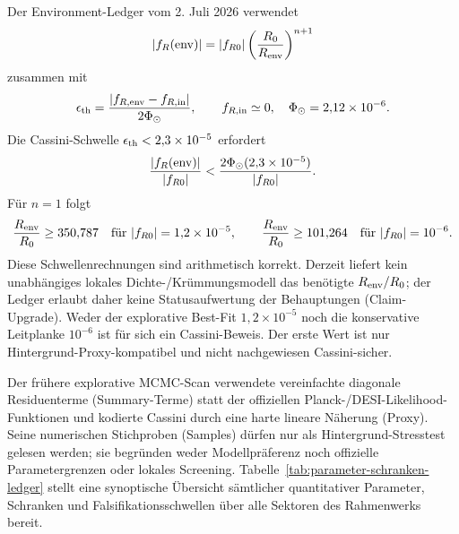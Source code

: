 \documentclass[12pt,a4paper]{article}
\theoremstyle{definition}
\theoremstyle{plain}
\theoremstyle{remark}
\begin{document}
Der Environment-Ledger vom 2. Juli 2026 verwendet
\begin{equation}\label{eq:environment-contract}
 |f_R({\rm env})|
 =|f_{R0}|\left(\frac{R_0}{R_{\rm env}}\right)^{n+1}
\end{equation}
zusammen mit
\[
 \epsilon_{\rm th}
 =\frac{|f_{R,{\rm env}}-f_{R,{\rm in}}|}{2\Phi_\odot},
 \qquad f_{R,{\rm in}}\simeq0,\quad
 \Phi_\odot=2{,}12\times10^{-6}.
\]
Die Cassini-Schwelle \(\epsilon_{\rm th}<2{,}3\times10^{-5}\) erfordert
\begin{equation}
 \frac{|f_R({\rm env})|}{|f_{R0}|}
 <\frac{2\Phi_\odot(2{,}3\times10^{-5})}{|f_{R0}|}.
\end{equation}
Für \(n=1\) folgt
\[
 \frac{R_{\rm env}}{R_0}\ge350{,}787
 \quad\text{für }|f_{R0}|=1{,}2\times10^{-5},
 \qquad
 \frac{R_{\rm env}}{R_0}\ge101{,}264
 \quad\text{für }|f_{R0}|=10^{-6}.
\]
Diese Schwellenrechnungen sind arithmetisch korrekt. Derzeit liefert kein
unabhängiges lokales Dichte-/Krümmungsmodell das benötigte
\(R_{\rm env}/R_0\); der Ledger erlaubt daher keine Statusaufwertung der Behauptungen (Claim-Upgrade). Weder der
explorative Best-Fit \(1{,}2\times10^{-5}\) noch die konservative Leitplanke
\(10^{-6}\) ist für sich ein Cassini-Beweis. Der erste Wert ist nur
Hintergrund-Proxy-kompatibel und nicht nachgewiesen Cassini-sicher.

Der frühere explorative MCMC-Scan verwendete vereinfachte diagonale
Residuenterme (Summary-Terme) statt der offiziellen Planck-/DESI-Likelihood-Funktionen und kodierte
Cassini durch eine harte lineare Näherung (Proxy). Seine numerischen Stichproben (Samples) dürfen
nur als Hintergrund-Stresstest gelesen werden; sie begründen weder
Modellpräferenz noch offizielle Parametergrenzen oder lokales Screening.
Tabelle~\ref{tab:parameter-schranken-ledger} stellt eine synoptische Übersicht sämtlicher quantitativer Parameter, Schranken und Falsifikationsschwellen über alle Sektoren des Rahmenwerks bereit.
\end{document}
